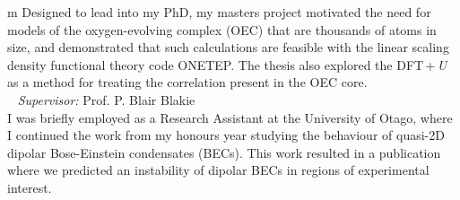 \documentclass[10pt,a4paper,final]{article}
\begin{document}
\begin{tabularx}{\textwidth}{
   m{\dimexpr{}\tabcolsep}}
   Designed to lead into my PhD, my masters project motivated the need for models of the oxygen-evolving complex (OEC) that are thousands of atoms in size, and demonstrated that such calculations are feasible with the linear scaling density functional theory code ONETEP. The thesis also explored the DFT\,+\,\emph{U} as a method for treating the correlation present in the OEC core.
   \\
   \hbox{%
   }
   \textit{Supervisor:} Prof. P. Blair Blakie
   \\
   I was briefly employed as a Research Assistant at the University of Otago, where I continued the work from my honours year studying the behaviour of quasi-2D dipolar Bose-Einstein condensates (BECs). This work resulted in a publication where we predicted an instability of dipolar BECs in regions of experimental interest.                                                          \\

\end{tabularx}
\end{document}
